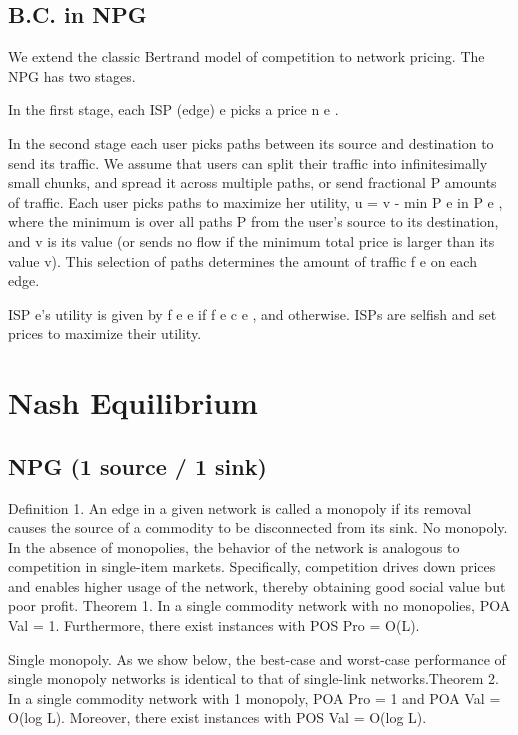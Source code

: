 \documentclass{beamer}
\begin{document}
\subsection{B.C. in NPG}

\begin{frame}
We extend the classic Bertrand model of competition to network pricing. The
NPG has two stages.

In the first stage, each ISP (edge) e picks a price n e .

In the second stage each user picks paths between its source and destination to send
its traffic. We assume that users can split their traffic into infinitesimally small
chunks, and spread it across multiple paths, or send fractional
P amounts of traffic.
Each user picks paths to maximize her utility, u = v - min P e in P e , where the
minimum is over all paths P from the user’s source to its destination, and v is
its value (or sends no flow if the minimum total price is larger than its value v).
This selection of paths determines the amount of traffic f e on each edge.

ISP e’s
utility is given by f e e if f e  c e , and  otherwise. ISPs are selfish and set
prices to maximize their utility.
\end{frame}


\section{Nash Equilibrium}

\subsection{NPG (1 source / 1 sink)}

\begin{frame}
Definition 1. An edge in a given network is called a monopoly if its removal
causes the source of a commodity to be disconnected from its sink.
No monopoly. In the absence of monopolies, the behavior of the network is
analogous to competition in single-item markets. Specifically, competition drives
down prices and enables higher usage of the network, thereby obtaining good
social value but poor profit.
Theorem 1. In a single commodity network with no monopolies, POA Val = 1.
Furthermore, there exist instances with POS Pro = O(L).
\end{frame}



\begin{frame}
Single monopoly. As we show below, the best-case and worst-case performance
of single monopoly networks is identical to that of single-link networks.Theorem 2. In a single commodity network with 1 monopoly, POA Pro = 1 and
POA Val = O(log L). Moreover, there exist instances with POS Val = O(log L).
\end{frame}
\end{document}
